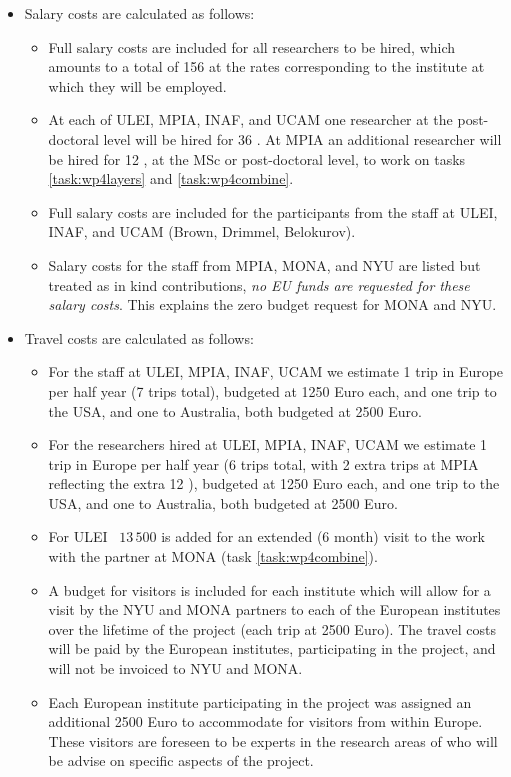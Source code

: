 \begin{itemize}
    \item Salary costs are calculated as follows:
    \begin{itemize}
        \item Full salary costs are included for all researchers to be hired, which amounts to a total of 156 {\pems} at the rates corresponding to the institute at which they will be employed.
        \item At each of ULEI, MPIA, INAF, and UCAM one researcher at the post-doctoral level will be hired for 36 {\pems}. At MPIA an additional researcher will be hired for 12 {\pems}, at the MSc or post-doctoral level, to work on tasks \ref{task:wp4layers} and \ref{task:wp4combine}.
        \item Full salary costs are included for the participants from the staff at ULEI, INAF, and UCAM (Brown, Drimmel, Belokurov).
        \item Salary costs for the staff from MPIA, MONA, and NYU are listed but treated as in kind contributions, \emph{no EU funds are requested for these salary costs}. This explains the zero budget request for MONA and NYU.
    \end{itemize}
    \item Travel costs are calculated as follows:
    \begin{itemize}
        \item For the staff at ULEI, MPIA, INAF, UCAM we estimate 1 trip in Europe per half year (7 trips total), budgeted at 1250 Euro each, and one trip to the USA, and one to Australia, both budgeted at 2500 Euro.
        \item For the researchers hired at ULEI, MPIA, INAF, UCAM we estimate 1 trip in Europe per half year (6 trips total, with 2 extra trips at MPIA reflecting the extra 12 \pems), budgeted at 1250 Euro each, and one trip to the USA, and one to Australia, both budgeted at 2500 Euro.
        \item For ULEI \EUR~$13\,500$ is added for an extended (6 month) visit to the work with the partner at MONA (task \ref{task:wp4combine}).
        \item A budget for visitors is included for each institute which will allow for a visit by the NYU and MONA partners to each of the European institutes over the lifetime of the project (each trip at 2500 Euro). The travel costs will be paid by the European institutes, participating in the project, and will not be invoiced to NYU and MONA. 
        \item Each European institute participating in the project was assigned an additional 2500 Euro to accommodate for visitors from within Europe. These visitors are foreseen to be experts in the research areas of {\acro} who will be advise on specific aspects of the project.

\end{itemize}
\end{itemize}
